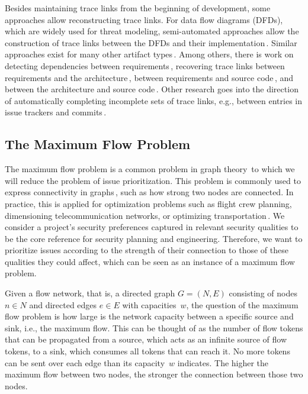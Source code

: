 Besides maintaining trace links from the beginning of development, some approaches allow reconstructing trace links. %
For data flow diagrams (DFDs), which are widely used for threat modeling, semi-automated approaches allow the construction of trace links between the DFDs and their implementation\,\cite{Peldszus2019SDF,TPS2022}.
Similar approaches exist for many other artifact types\,\cite{Rasiman2022,Merten2016}.
Among others, there is work on detecting dependencies between requirements\,\cite{Samer2019NAI,Wang2020DSS}, recovering trace links between requirements and the architecture\,\cite{Goknil2014,Keim2024},
between requirements and source code\,\cite{10.1145/2491627.2491633,Hey2024}, and between the architecture and source code\,\cite{keim2021trace}.
Other research goes into the direction of automatically completing incomplete sets of trace links, e.g., between entries in issue trackers and commits\,\cite{rath2018}.

\subsection{The Maximum Flow Problem}
\noindent
The maximum flow problem is a common problem in graph theory\,\cite{harris1955} to which we will reduce the problem of issue prioritization.%
This problem is commonly used to express connectivity in graphs\,\cite{Esfahanian2013}, such as how strong two nodes are connected.
In practice, this is applied for optimization problems such as flight crew planning, dimensioning telecommunication networks, or optimizing transportation\,\cite{Feng2012}.
We consider a project's security preferences captured in relevant security qualities to be the core reference for security planning and engineering.
Therefore, we want to prioritize issues according to the strength of their connection to those of these qualities they could affect, which can be seen as an instance of a maximum flow problem.

Given a flow network, that is, a directed graph $G = (N,E)$ consisting of nodes $n \in N$ and directed edges $e \in E$ with capacities~$w$, the question of the maximum flow problem is how large is the network capacity between a specific source and sink, i.e., the maximum flow.
This can be thought of as the number of flow tokens that can be propagated from a source, which acts as an infinite source of flow tokens, to a sink, which consumes all tokens that can reach it.
No more tokens can be sent over each edge than its capacity~$w$ indicates.
The higher the maximum flow between two nodes, the stronger the connection between those two nodes.

